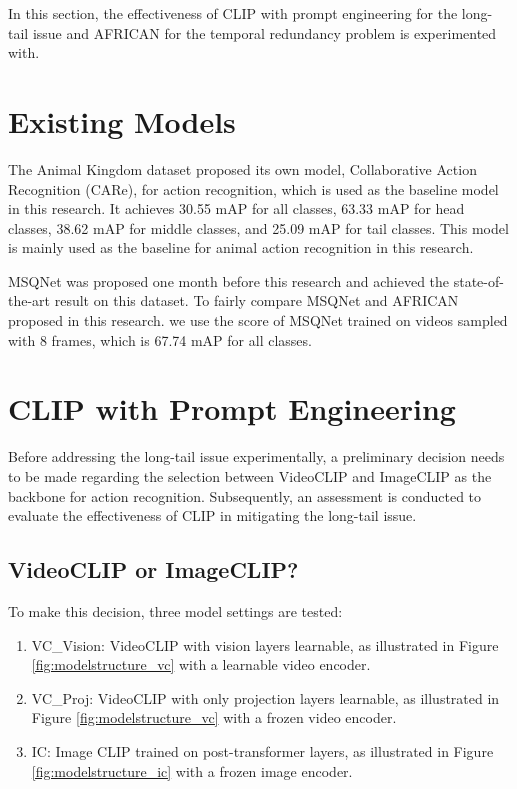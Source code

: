 In this section, the effectiveness of CLIP with prompt engineering for the long-tail issue and AFRICAN for the temporal redundancy problem is experimented with.

\section {Existing Models}
The Animal Kingdom dataset proposed its own model, Collaborative Action Recognition (CARe), for action recognition, which is used as the baseline model in this research. It achieves 30.55 mAP for all classes, 63.33 mAP for head classes, 38.62 mAP for middle classes, and 25.09 mAP for tail classes. This model is mainly used as the baseline for animal action recognition in this research.

MSQNet was proposed one month before this research and achieved the state-of-the-art result on this dataset. To fairly compare MSQNet \parencite{mondal2023msqnet} and AFRICAN proposed in this research. we use the score of MSQNet trained on videos sampled with 8 frames, which is 67.74 mAP for all classes. 

\section{CLIP with Prompt Engineering}
Before addressing the long-tail issue experimentally, a preliminary decision needs to be made regarding the selection between VideoCLIP and ImageCLIP as the backbone for action recognition. Subsequently, an assessment is conducted to evaluate the effectiveness of CLIP in mitigating the long-tail issue.

\subsection{VideoCLIP or ImageCLIP?}
\label{sec:imageclipbetter}
To make this decision, three model settings are tested: 

\begin{enumerate}
    \item VC\_Vision: VideoCLIP with vision layers learnable, as illustrated in Figure \ref{fig:modelstructure_vc} with a learnable video encoder.
    \item VC\_Proj: VideoCLIP with only projection layers learnable, as illustrated in Figure \ref{fig:modelstructure_vc} with a frozen video encoder.
    \item IC: Image CLIP trained on post-transformer layers, as illustrated in Figure \ref{fig:modelstructure_ic} with a frozen image encoder.
\end{enumerate}

